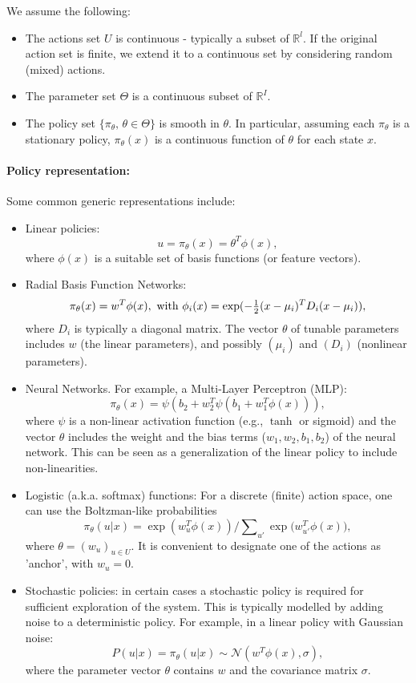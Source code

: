 We assume the following:
\begin{itemize}
  \item The actions set $U$ is continuous - typically a subset of $\mathbb R^l$.
If the original action set is finite, we extend it to a continuous set by considering  random (mixed) actions.
  \item The parameter set $\Theta $ is a continuous subset of $\mathbb R^I$.
  \item The policy set $\{ {\pi _\theta },\,\theta  \in \Theta \} $ is smooth in $\theta $. In particular, assuming each ${\pi _\theta }$ is a stationary policy,  ${\pi _\theta }(x)$ is a continuous function of $\theta $ for each state $x$.
\end{itemize}

\paragraph{Policy representation:} Some common generic representations include:
\begin{itemize}
  \item Linear policies:
                                      $$u = {\pi _\theta }(x) = {\theta ^T}\phi (x),$$
where $\phi (x)$ is a suitable set of basis functions (or  feature vectors).
  \item Radial Basis Function Networks:
             $${\pi _\theta }(x) = {w^T}\phi (x),  \textrm{ with }  {\phi _i}(x) = \exp ( - {\textstyle{1 \over 2}}{(x - {\mu _i})^T}{D_i}(x - {\mu _i})),$$
where ${D_i}$ is typically a diagonal matrix. The vector $\theta $ of tunable parameters includes $w$ (the linear parameters), and possibly $({\mu _i})$ and $({D_i})$ (nonlinear parameters).
  \item Neural Networks. For example, a Multi-Layer Perceptron (MLP):
  $$
    {\pi _\theta }(x) = \psi(b_2 + w_2^T \psi(b_1 + {w_1^T}\phi (x))),
  $$
  where $\psi$ is a non-linear activation function (e.g., $\tanh$ or sigmoid) and the vector $\theta$ includes the weight and the bias terms ($w_1,w_2,b_1,b_2$) of the neural network. This can be seen as a generalization of the linear policy to include non-linearities.
  \item Logistic (a.k.a. softmax) functions: For a discrete (finite) action space, one can use the Boltzman-like probabilities
                           $${\pi _\theta }(u|x) = \exp (w_u^T\phi (x))/\sum\nolimits_{u'} {\exp (w_{u'}^T\phi (x)} ),$$
where  $\theta  = {({w_u})_{u \in U}}$. It is convenient to designate one of the actions as 'anchor', with ${w_u} = 0$.
\item Stochastic policies: in certain cases a stochastic policy is required for sufficient exploration of the system. This is typically modelled by adding noise to a deterministic policy. For example, in a linear policy with Gaussian noise:
$$
P(u|x) = {\pi _\theta }(u|x) \sim \mathcal{N}\left( {w ^T}\phi (x), \sigma \right),
$$
where the parameter vector $\theta$ contains $w$ and the covariance matrix $\sigma$.
\end{itemize}

